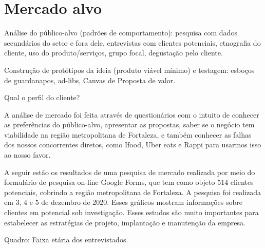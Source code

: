 \section{\textbf{Mercado alvo}}
\label{sec: Mercado}

\begin{commentA} \vspace{0.3cm} \noindent Análise do público-alvo (padrões de comportamento): pesquisa com dados secundários do setor e fora dele, entrevistas com clientes potenciais, etnografia do cliente, uso do produto/serviços, grupo focal, degustação pelo cliente. \par \vspace{0.1cm} \end{commentA}

\begin{commentA} \vspace{0.3cm} \noindent Construção de protótipos da ideia (produto viável mínimo) e testagem: esboços de guardanapos, ad-libs, Canvas de Proposta de valor. \par \vspace{0.1cm} \end{commentA}

\begin{commentA} \vspace{0.3cm} \noindent Qual o perfil do cliente? \par \vspace{0.1cm} \end{commentA}

A análise de mercado foi feita através de questionários com o intuito de conhecer as preferências do público-alvo, apresentar as propostas, saber se o negócio tem viabilidade na região metropolitana de Fortaleza, e também conhecer as falhas dos nossos concorrentes diretos, como Ifood, Uber eats e Rappi para usarmos isso ao nosso favor.\par

A seguir estão os resultados de uma pesquisa de mercado realizada por meio do formulário de pesquisa on-line Google Forms, que tem como objeto 514 clientes potenciais, cobrindo a região metropolitana de Fortaleza. A pesquisa foi realizada em 3, 4 e 5 de dezembro de 2020. Esses gráficos mostram informações sobre clientes em potencial sob investigação. Esses estudos são muito importantes para estabelecer as estratégias de projeto, implantação e manutenção da empresa.\par

\begin{commentB}
Quadro: Faixa etária dos entrevistados.
\par \end{commentB}

